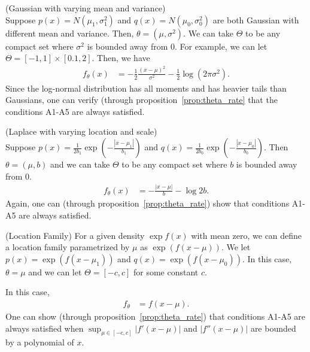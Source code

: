 \documentclass{article}
\begin{document}
\begin{example} (Gaussian with varying mean and variance)\\
Suppose $p(x) = N(\mu_1, \sigma_1^2)$ and $q(x) = N(\mu_0, \sigma_0^2)$ are both Gaussian with different mean and variance. Then, $\theta = (\mu, \sigma^2)$. We can take $\Theta$ to be any compact set where $\sigma^2$ is bounded away from 0. For example, we can let $\Theta = [-1,1] \times [0.1, 2]$. Then, we have
\begin{align*}
f_\theta(x) &= - \frac{1}{2} \frac{(x - \mu)^2 }{\sigma^2} - \frac{1}{2} \log (2\pi \sigma^2 ).
\end{align*}
Since the log-normal distribution has all moments and has heavier tails than Gaussians, one can verify (through proposition~\ref{prop:theta_rate} that the conditions A1-A5 are always satisfied.
\end{example}

\begin{example} (Laplace  with varying location and scale)\\
Suppose $p(x) = \frac{1}{2b_1} \exp\left( - \frac{|x - \mu_1|}{b_1} \right)$ and $q(x) = \frac{1}{2b_0} \exp\left( - \frac{|x - \mu_0|}{b_0} \right)$. Then $\theta = (\mu, b)$ and we can take $\Theta$ to be any compact set where $b$ is bounded away from 0.
\begin{align*}
f_{\theta}(x) &= - \frac{|x - \mu|}{b} - \log 2b.
\end{align*}
Again, one can (through proposition~\ref{prop:theta_rate}) show that conditions A1-A5 are always satisfied.
\end{example}

\begin{example} (Location Family)
For a given density $\exp f(x)$ with mean zero, we can define a location family parametrized by $\mu$ as $\exp( f(x - \mu))$. We let $p(x) = \exp( f( x - \mu_1))$ and $q(x) = \exp( f ( x - \mu_0))$. In this case, $\theta = \mu$ and we can let $\Theta = [-c, c]$ for some constant $c$. 

In this case, 
\begin{align*}
f_{\theta} &= f( x - \mu).
\end{align*}
One can show (through proposition~\ref{prop:theta_rate}) that conditions A1-A5 are always satisfied when $\sup_{\mu \in [-c, c]} | f'(x-  \mu) |$ and $| f''(x - \mu) |$ are bounded by a polynomial of $x$.

\end{example}
\end{document}
